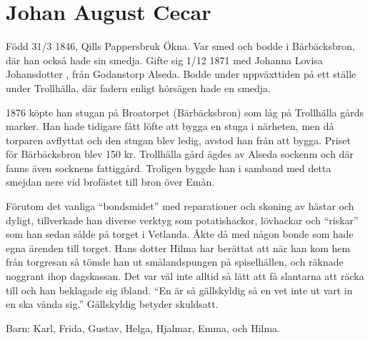 \chapter{Johan August Cecar}
\label{johan_august_cecar}
Född 31/3 1846, Qills Pappersbruk Ökna.
Var smed och bodde i Bärbäcksbron, där han också hade sin smedja.
Gifte sig 1/12 1871 med Johanna Lovisa Johansdotter , från Godanstorp Alseda. Bodde under uppväxttiden på ett ställe under Trollhälla, där fadern enligt hörsägen hade en smedja.

1876 köpte han stugan på Broatorpet (Bärbäcksbron) som låg på Trollhälla gårds marker. Han hade tidigare fått löfte att bygga en stuga i närheten, men då torparen avflyttat och den stugan blev ledig, avstod han från att bygga. Priset för Bärbäcksbron blev 150 kr. Trollhälla gård ägdes av Alseda sockenm och där fanns även socknens fattiggård. Troligen byggde han i samband med detta smejdan nere vid brofästet till bron över Emån. 

Förutom det vanliga “bondsmidet” med reparationer och skoning av hästar och dyligt, tillverkade han diverse verktyg som potatishackor, lövhackar och “riskar” som han sedan sålde på torget i Vetlanda. Åkte då med någon bonde som hade egna ärenden till torget. Hans dotter Hilma har berättat att när han kom hem från torgresan så tömde han ut smålandspungen på spiselhällen, och räknade noggrant ihop dagskassan. Det var väl inte alltid så lätt att få slantarna att räcka till och han beklagade sig ibland. ``En är så gällskyldig så en vet inte ut vart in en ska vända sig.'' Gällskyldig betyder skuldsatt.

Barn: Karl, Frida, Gustav, Helga, Hjalmar, Emma, och Hilma.

